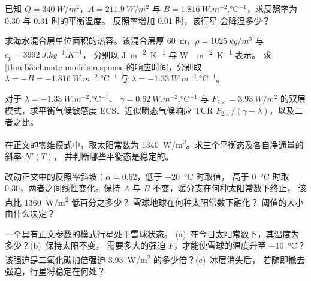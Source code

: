 \begin{exercise}[$\star$]\label{exo:b3:climate-models:2}
已知 $Q = \qty{340}{W/m^2}$，$A = \qty{211.9}{W/m^2}$ 与 $B =
\qty{1.816}{W.m^{-2}.\celsius^{-1}}$，求反照率为 0.30 与 0.31 时的平衡温度。
反照率增加 0.01 时，该行星
会降温多少？
\end{exercise}

\begin{exercise}[$\star$]\label{exo:b3:climate-models:3}
求海水混合层单位面积的热容。该混合层厚
\qty{60}{m}，$\rho = \qty{1025}{kg/m^3}$ 与 $c_p = \qty{3992}{J.kg^{-1}.K^{-1}}$，
分别以 \unit{J.m^{-2}.K^{-1}} 与 \unit{W..m^{-2}.K^{-1}} 表示。
求\cref{thm:b3:climate-models:response}的响应时间，分别取 $\lambda = -B =
\qty{-1.816}{W.m^{-2}.\celsius^{-1}}$ 与 $\lambda =
\qty{-1.33}{W.m^{-2}.\celsius^{-1}}$。
\end{exercise}

\begin{exercise}[$\star$]\label{exo:b3:climate-models:4}
对于 $\lambda = \qty{-1.33}{W.m^{-2}.\celsius^{-1}}$、
$\gamma = \qty{0.62}{W.m^{-2}.\celsius^{-1}}$ 与 $F_{2\times} =
\qty{3.93}{W/m^2}$ 的双层模式，求平衡气候敏感度 ECS、近似瞬态气候响应 TCR $F_{2\times}/
(\gamma - \lambda)$，以及二者之比。
\end{exercise}

\begin{exercise}[$\star\star$]\label{exo:b3:climate-models:5}
在正文的零维模式中，取太阳常数为
\qty{1340}{W/m^2}。求三个平衡态及各自净通量的斜率 $N'(T)$，
并判断哪些平衡态是稳定的。
\end{exercise}

\begin{exercise}[$\star\star$]\label{exo:b3:climate-models:6}
改动正文中的反照率斜坡：$\alpha = 0.62$，低于 \qty{-20}{\celsius} 时取值，
高于 \qty{0}{\celsius} 时取 $0.30$，两者之间线性变化。保持 $A$ 与 $B$ 不变，暖分支在何种太阳常数下终止，
该点比 \qty{1360}{W/m^2} 低百分之多少？
雪球地球在何种太阳常数下融化？
阈值的大小由什么决定？
\end{exercise}

\begin{exercise}[$\star\star$]\label{exo:b3:climate-models:7}
一个具有正文参数的模式行星处于雪球状态。
(a)~在今日太阳常数下，其温度为多少？(b)~保持太阳不变，
需要多大的强迫 $F$，才能使雪球的温度升至
\qty{-10}{\celsius}？该强迫是二氧化碳加倍强迫
\qty{3.93}{W/m^2} 的多少倍？(c)~冰层消失后，
若随即撤去强迫，行星将稳定在何处？
\end{exercise}

